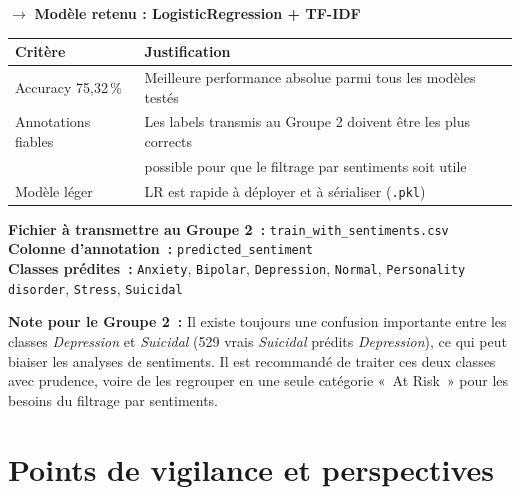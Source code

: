 \documentclass[12pt,a4paper]{article}
\begin{document}
\begin{center}
\Large $\rightarrow$ \textbf{Modèle retenu : LogisticRegression + TF-IDF}
\end{center}

\begin{center}
\renewcommand{\arraystretch}{1.2}
\begin{tabular}{ll}
\toprule
\textbf{Critère} & \textbf{Justification} \\
\midrule
Accuracy 75,32\,\% & Meilleure performance absolue parmi tous les modèles testés \\
Annotations fiables & Les labels transmis au Groupe 2 doivent être les plus corrects \\
                    & possible pour que le filtrage par sentiments soit utile \\
Modèle léger        & LR est rapide à déployer et à sérialiser (\texttt{.pkl}) \\
\bottomrule
\end{tabular}
\end{center}

\textbf{Fichier à transmettre au Groupe 2~:} \texttt{train\_with\_sentiments.csv}\\
\textbf{Colonne d'annotation~:} \texttt{predicted\_sentiment}\\
\textbf{Classes prédites~:} \texttt{Anxiety}, \texttt{Bipolar}, \texttt{Depression}, \texttt{Normal}, \texttt{Personality disorder}, \texttt{Stress}, \texttt{Suicidal}

\begin{avertissement}
\textbf{Note pour le Groupe 2~:} Il existe toujours une confusion importante entre 
les classes \textit{Depression} et \textit{Suicidal} (529 vrais \textit{Suicidal} 
prédits \textit{Depression}), ce qui peut biaiser les analyses de sentiments. 
Il est recommandé de traiter ces deux classes avec prudence, 
voire de les regrouper en une seule catégorie «~At Risk~» pour les besoins 
du filtrage par sentiments.

\end{avertissement}

\section{Points de vigilance et perspectives}
\end{document}
